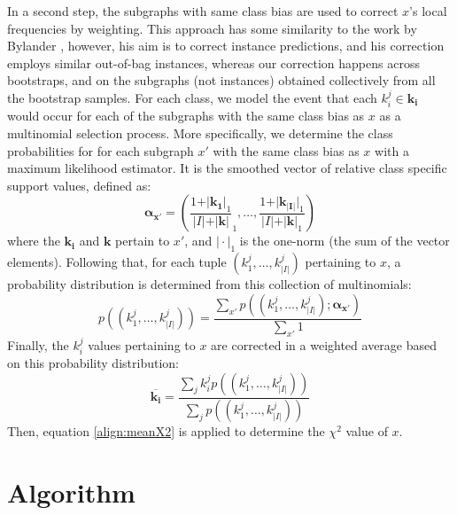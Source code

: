 \documentclass{article}
\begin{document}
In a second step, the subgraphs with same class bias are used to correct $x$'s
local frequencies by weighting. This approach has some similarity to the work
by Bylander \cite{bylander02estimating}, however, his aim is to correct
instance predictions, and his correction employs similar out-of-bag instances,
whereas our correction happens across bootstraps, and on the subgraphs (not
instances) obtained collectively from all the bootstrap samples.  For each
class, we model the event that each $k_i^j \in \mathbf{k_i}$ would occur for
each of the subgraphs with the same class bias as $x$ as a multinomial
selection process.  More specifically, we determine the class probabilities for
for each subgraph $x'$ with the same class bias as $x$ with a maximum
likelihood estimator. It is the smoothed vector of relative class specific support
values, defined as:
\begin{equation}
  \mathbf{\alpha_{x'}} = \left(\frac{1+\vert\mathbf{k_1}\vert_1}{\vert I\vert+\vert\mathbf{k}\vert}_1,\ldots,\frac{1+\vert\mathbf{k_{\vert I\vert}}\vert_1}{\vert I\vert+\vert\mathbf{k}\vert_1}\right)
  \label{eqn:mlexpr}
\end{equation}
where the $\mathbf{k_i}$ and $\mathbf{k}$ pertain to $x'$, and $\vert\cdot\vert_1$ is the one-norm (the sum of the vector elements). Following that, for
each tuple $(k_1^j,\ldots,k_{\vert I\vert}^j)$ pertaining to $x$, a probability distribution is
determined from this collection of multinomials:
\begin{equation}
  p((k_1^j,\ldots,k_{\vert I\vert}^j))=\frac{\sum_{x'} p((k_1^j,\ldots,k_{\vert I\vert}^j); \mathbf{\alpha_{x'}})}{\sum_{x'}1}
  \label{eqn:avgpr}
\end{equation}
Finally, the $k_i^j$ values pertaining to $x$ are corrected in a weighted average
based on this probability distribution:
\begin{equation}
  \overline{\mathbf{k_i}}=\frac{\sum_j k_i^j p((k_1^j,\ldots,k_{\vert I\vert}^j))}{\sum_j p((k_1^j,\ldots,k_{\vert I\vert}^j))}
  \label{eqn:avgki}
\end{equation}
Then, equation \ref{align:meanX2} is applied to determine the $\chi^2$ value of $x$.

\section{Algorithm}
\end{document}

